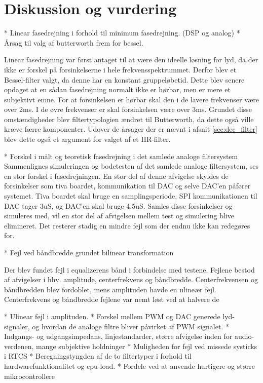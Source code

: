 \chapter{Diskussion og vurdering}\label{kap:diskussion}




* Linear fasedrejning i forhold til minimum fasedrejning. (DSP og analog)
* Årsag til valg af butterworth frem for bessel. 

Linear fasedrejning var først antaget til at være den ideelle løsning for lyd, da der ikke er forskel på forsinkelserne i hele frekvensspektrummet. Derfor blev et Bessel-filter valgt, da denne har en konstant gruppeløbetid. 
Dette blev senere opdaget at en sådan fasedrejning normalt ikke er hørbar, men er mere et subjektivt emne. 
For at forsinkelsen er hørbar skal den i de lavere frekvenser være over 2ms. 
I de øvre frekvenser er skal forsinkelsen være over 3ms.
Grundet disse omstændigheder blev filtertypologien ændret til Butterworth, da dette også ville kræve færre komponenter. 
Udover de årsager der er nævnt i afsnit \ref{sec:dec_filter} blev dette også et argument for valget af et IIR-filter. 


* Forskel i målt og teoretisk fasedrejning i det samlede analoge filtersystem
Sammenlignes simuleringen og bodetesten af det samlede analoge filtersystem, ses en stor forskel i fasedrejningen. En stor del af denne afvigelse skyldes de forsinkelser som tiva boardet, kommunikation til DAC og selve DAC'en påfører systemet. 
Tiva boardet skal bruge en samplingsperiode, SPI kommunikationen til DAC tager 3uS, og DAC'en skal bruge 4.5uS. Samles disse forsinkelser og simuleres med, vil en stor del af afvigelsen mellem test og simulering blive elimineret. Det resterer stadig en mindre fejl som der endnu ikke kan redegøres for. 


* Fejl ved båndbredde grundet bilinear transformation 

Der blev fundet fejl i equalizerens bånd i forbindelse med testene. Fejlene bestod af afvigelser i hhv. amplitude, centerfrekvens og båndbredde. Centerfrekvensen og båndbredden blev fordoblet, mens amplituden havde en ulineær fejl. Centerfrekvens og båndbredde fejlene var nemt løst ved at halvere de 

* Ulinear fejl i amplituden.
* Forskel mellem PWM og DAC generede lyd-signaler, og hvordan de analoge filtre bliver påvirket af PWM signalet.
* Indgangs- og udgangsimpedans, linjestandarder, større afvigelse inden for audio-verdenen, mange subjektive holdninger
* Muligheden for fejl ved missede systicks i RTCS
* Beregningstyngden af de to filtertyper i forhold til hardwarefunktionalitet og cpu-load. 
* Fordele ved at anvende hurtigere og større mikrocontrollere



